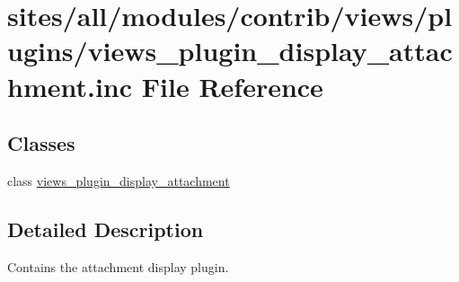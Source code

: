 \hypertarget{views__plugin__display__attachment_8inc}{
\section{sites/all/modules/contrib/views/plugins/views\_\-plugin\_\-display\_\-attachment.inc File Reference}
\label{views__plugin__display__attachment_8inc}
}
\subsection*{Classes}
\begin{CompactItemize}
\item 
class \hyperlink{classviews__plugin__display__attachment}{views\_\-plugin\_\-display\_\-attachment}
\end{CompactItemize}


\subsection{Detailed Description}
Contains the attachment display plugin. 